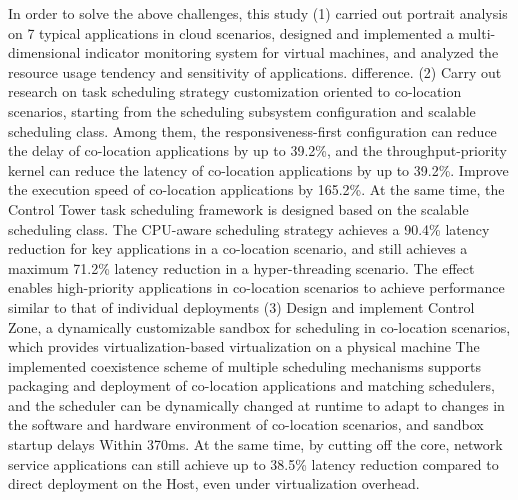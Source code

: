 In order to solve the above challenges, this study (1) carried out portrait analysis on 7 typical applications in cloud scenarios, designed and implemented a multi-dimensional indicator monitoring system for virtual machines, and analyzed the resource usage tendency and sensitivity of applications. difference. (2) Carry out research on task scheduling strategy customization oriented to co-location scenarios, starting from the scheduling subsystem configuration and scalable scheduling class. Among them, the responsiveness-first configuration can reduce the delay of co-location applications by up to 39.2\%, and the throughput-priority kernel can reduce the latency of co-location applications by up to 39.2\%. Improve the execution speed of co-location applications by 165.2\%. At the same time, the Control Tower task scheduling framework is designed based on the scalable scheduling class. The CPU-aware scheduling strategy achieves a 90.4\% latency reduction for key applications in a co-location scenario, and still achieves a maximum 71.2\% latency reduction in a hyper-threading scenario. The effect enables high-priority applications in co-location scenarios to achieve performance similar to that of individual deployments (3) Design and implement Control Zone, a dynamically customizable sandbox for scheduling in co-location scenarios, which provides virtualization-based virtualization on a physical machine The implemented coexistence scheme of multiple scheduling mechanisms supports packaging and deployment of co-location applications and matching schedulers, and the scheduler can be dynamically changed at runtime to adapt to changes in the software and hardware environment of co-location scenarios, and sandbox startup delays Within 370ms. At the same time, by cutting off the core, network service applications can still achieve up to 38.5\% latency reduction compared to direct deployment on the Host, even under virtualization overhead.



\pagestyle{enfrontmatterstyle}%
\cleardoublepage\pagestyle{frontmatterstyle}%

